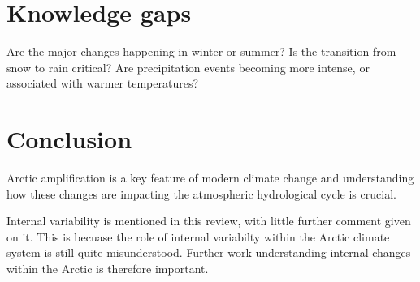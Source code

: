 \documentclass[12pt, oneside]{article}
\begin{document}
\section{Knowledge gaps}


Are the major changes happening in winter or summer? Is the transition from snow to rain critical? Are precipitation events becoming more intense, or associated with warmer temperatures? 



\section{Conclusion}


Arctic amplification is a key feature of modern climate change and understanding how these changes are impacting the atmospheric hydrological cycle is crucial. 


Internal variability is mentioned in this review, with little further comment given on it. This is becuase the role of internal variabilty within the Arctic climate system is still quite misunderstood. Further work understanding internal changes within the Arctic is therefore important. 


 {}

\end{document}
